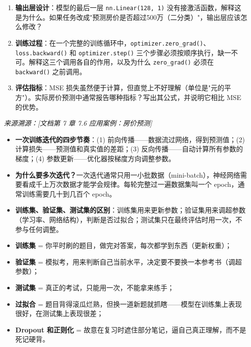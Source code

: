 \documentclass[a4paper,11pt]{ctexart}
\begin{document}
\begin{problembox}
\begin{enumerate}[(1)]
        \item \textbf{输出层设计}：模型的最后一层 \texttt{nn.Linear(128, 1)} 没有接激活函数，解释这是为什么。如果任务改成"预测房价是否超过500万（二分类）"，输出层应该怎么修改？

        \item \textbf{训练过程}：在一个完整的训练循环中，\texttt{optimizer.zero\_grad()}、\texttt{loss.backward()} 和 \texttt{optimizer.step()} 三个步骤必须按顺序执行，缺一不可。解释这三个调用各自的作用，以及为什么 \texttt{zero\_grad()} 必须在 \texttt{backward()} 之前调用。

        \item \textbf{评估指标}：MSE 损失虽然便于计算，但直觉上不好理解（单位是"元的平方"）。实际房价预测中通常报告哪种指标？写出其公式，并说明它相比 MSE 的优势。
    \end{enumerate}

    \vspace{0.2cm}
    {\color{gray}\small\textit{来源溯源：[文档第 7 章 7.6 应用案例：房价预测]}}
\end{problembox}

\begin{beginnerbox}
    \begin{itemize}
        \item \textbf{一次训练迭代的四步节奏}：(1) 前向传播——数据流过网络，得到预测值；(2) 计算损失——预测值和真实值的差距；(3) 反向传播——自动计算所有参数的梯度；(4) 参数更新——优化器按梯度方向调整参数。
        \item \textbf{为什么要多次迭代？}一次迭代通常只用一小批数据（mini-batch），神经网络需要看成千上万次数据才能学会规律。每轮完整过一遍数据集叫一个 epoch，通常训练需要几十到几百个 epoch。
        \item \textbf{训练集、验证集、测试集的区别}：训练集用来更新参数；验证集用来调超参数（学习率、网络结构），判断是否过拟合；测试集只在最终评估时用一次，不参与任何调整。
    \end{itemize}
\end{beginnerbox}

\begin{metaphorbox}
    \begin{itemize}
        \item \textbf{训练集} = 你平时刷的题目，做完对答案，每次都学到东西（更新权重）；
        \item \textbf{验证集} = 模拟考，用来判断自己当前水平，决定要不要换一本参考书（调超参数）；
        \item \textbf{测试集} = 真正的考试，只能用一次，不能拿来练手；
        \item \textbf{过拟合} = 题目背得滚瓜烂熟，但换一道新题就抓瞎——模型在训练集上表现很好，在测试集上表现很差；
        \item \textbf{Dropout 和正则化} = 故意在复习时遮住部分笔记，逼自己真正理解，而不是死记硬背。
    \end{itemize}
\end{metaphorbox}
\end{document}

